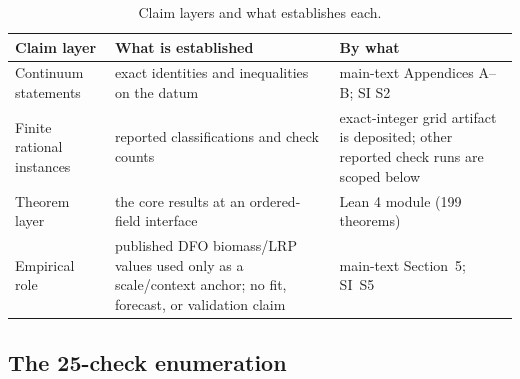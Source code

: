 \documentclass[preprint,11pt,authoryear]{elsarticle}
\theoremstyle{remark}
\begin{document}
\begin{table}[!htbp]
\centering\small
\caption{Claim layers and what establishes each.}
\begin{tabularx}{\textwidth}{@{}>{\raggedright\arraybackslash}p{}XX@{}}
\toprule
Claim layer & What is established & By what \\
\midrule
Continuum statements & exact identities and inequalities on the datum & main-text Appendices A--B; SI S2 \\
Finite rational instances & reported classifications and check counts & exact-integer grid artifact is deposited; other reported check runs are scoped below \\
Theorem layer & the core results at an ordered-field interface & Lean 4 module (199 theorems) \\
Empirical role & published DFO biomass/LRP values used only as a scale/context anchor; no fit, forecast, or validation claim & main-text Section~5; SI~S5 \\
\bottomrule
\end{tabularx}
\end{table}

\subsection{The 25-check enumeration}
\end{document}
